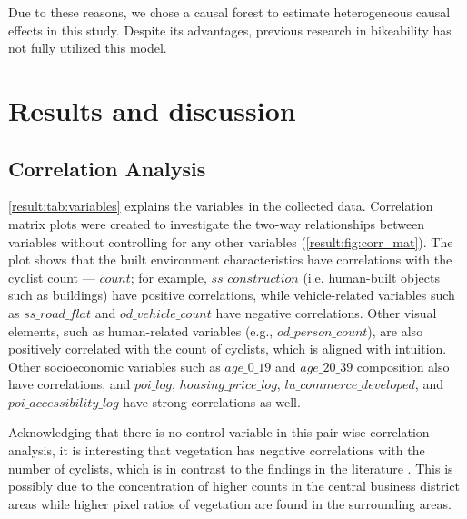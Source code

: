 \documentclass[preprint,12pt, authoryear]{elsarticle}
\begin{document}
Due to these reasons, we chose a causal forest to estimate heterogeneous causal effects in this study. Despite its advantages, previous research in bikeability has not fully utilized this model.

\section{Results and discussion} \label{sc:result}
\subsection{Correlation Analysis}
\autoref{result:tab:variables} explains the variables in the collected data.
Correlation matrix plots were created to investigate the two-way relationships between variables without controlling for any other variables (\autoref{result:fig:corr_mat}). The plot shows that the built environment characteristics have correlations with the cyclist count --- $count$; for example, $ss\_construction$ (i.e. human-built objects such as buildings) have positive correlations, while vehicle-related variables such as $ss\_road\_flat$ and $od\_vehicle\_count$ have negative correlations. 
Other visual elements, such as human-related variables (e.g., $od\_person\_count$), are also positively correlated with the count of cyclists, which is aligned with intuition. 
Other socioeconomic variables such as $age\_0\_19$ and $age\_20\_39$ composition also have correlations, and $poi\_log$, $housing\_price\_log$, $lu\_commerce\_developed$, and $poi\_accessibility\_log$ have strong correlations as well.

Acknowledging that there is no control variable in this pair-wise correlation analysis, it is interesting that vegetation has negative correlations with the number of cyclists, which is in contrast to the findings in the literature \citep{bai_how_2022, chen_eyelevel_2020}. This is possibly due to the concentration of higher counts in the central business district areas while higher pixel ratios of vegetation are found in the surrounding areas.
\end{document}
